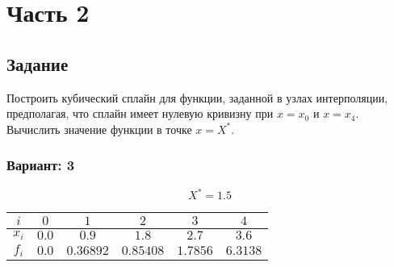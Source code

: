 
\chapter*{Часть 2}

\section*{Задание}
Построить кубический сплайн для функции,
заданной в узлах интерполяции, предполагая,
что сплайн имеет нулевую кривизну при
$x = x_0$ и $x = x_4$.
Вычислить значение функции в точке $x = X^*$.

\subsection*{Вариант: 3}

\begin{equation*}
    X^* = 1.5
\end{equation*}

\begin{center}
\begin{tabular}{| c | c | c | c | c | c|}
    \hline 
    $i$ & $0$ & $1$ & $2$ & $3$ & $4$ \\
    \hline
    $x_i$ & $0.0$ & $0.9$ & $1.8$ & $2.7$ & $3.6$ \\
    \hline
    $f_i$ & $0.0$ & $0.36892$ & $0.85408$ & $1.7856$
        & $6.3138$ \\
    \hline
\end{tabular}   
\end{center}


\pagebreak